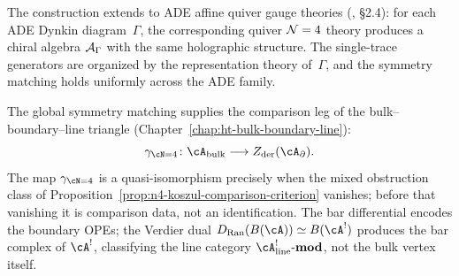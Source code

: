 \begin{remark}
\label{rem:affine-quiver-generalization}
The construction extends to ADE affine quiver gauge theories
\textup{(}\!\cite{CG18}, \S2.4\textup{)}: for each ADE Dynkin
diagram~$\Gamma$, the corresponding quiver $\mathcal N=4$ theory produces a
chiral algebra $\mathcal A_\Gamma$ with the same holographic structure. The
single-trace generators are organized by the representation theory
of~$\Gamma$, and the symmetry matching holds uniformly across the
ADE family.
\end{remark}

\begin{remark}
\label{rem:symmetry-koszul}
The global symmetry matching supplies the comparison leg of the
bulk--boundary--line triangle
\textup{(}Chapter~\textup{\ref{chap:ht-bulk-boundary-line}}\textup{)}:
\begin{equation}\label{eq:symmetry-koszul-matching}
\gamma_{\cN=4}\colon
\cA_{\mathrm{bulk}} \longrightarrow Z_{\mathrm{der}}(\cA_{\partial}).
\end{equation}
The map $\gamma_{\cN=4}$ is a quasi-isomorphism precisely when the
mixed obstruction class of
Proposition~\ref{prop:n4-koszul-comparison-criterion} vanishes; before
that vanishing it is comparison data, not an identification.
The bar differential encodes the boundary OPEs; the Verdier dual
$D_{\mathrm{Ran}}(B(\cA)) \simeq B(\cA^!)$ produces the bar complex
of $\cA^!$, classifying the line category
$\cA^!_{\mathrm{line}}\text{-}\mathbf{mod}$, not the bulk vertex
itself.
\end{remark}

